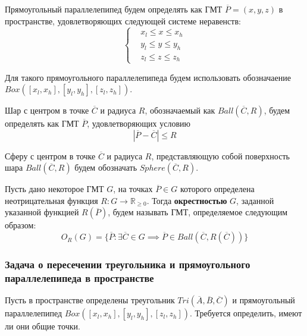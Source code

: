 Прямоугольный параллелепипед будем определять как ГМТ $\overline{P} = (x, y, z)$ в пространстве, удовлетворяющих следующей системе неравенств:
\begin{equation}\label{eqn:text_1_geo_prim_parallelepiped}
	\left\{
		\begin{aligned}
			& x_l \le x \le x_h \\
			& y_l \le y \le y_h \\
			& z_l \le z \le z_h
		\end{aligned}
	\right.
\end{equation}

Для такого прямоугольного параллелепипеда будем использовать обозначаение $Box([x_l, x_h], [y_l, y_h], [z_l, z_h])$.

Шар с центром в точке $\overline{C}$ и радиуса $R$, обозначаемый как $Ball(\overline{C}, R)$, будем определять как ГМТ $\overline{P}$, удовлетворяющих условию
\begin{equation}
	|\overline{P} - \overline{C}| \le R
\end{equation}

Сферу с центром в точке $\overline{C}$ и радиуса $R$, представляющую собой поверхность шара $Ball(\overline{C}, R)$ будем обозначать $Sphere(\overline{C}, R)$.

\begin{definition}
Пусть дано некоторое ГМТ $G$, на точках $\overline{P} \in G$ которого определена неотрицательная функция $R: G \rightarrow \mathbb{R}_{\ge 0}$.
Тогда \textbf{окрестностью}\label{term:envelope} $G$, заданной указанной функцией $R(\overline{P})$, будем называть ГМТ, определяемое следующим образом:
\begin{equation}
	O_R(G) = \{ \overline{P}: \exists \overline{C} \in G \implies \overline{P} \in Ball(\overline{C}, R(\overline{C})) \}
\end{equation}
\end{definition}

\subsubsection{Задача о пересечении треугольника и прямоугольного параллелепипеда в пространстве}\label{sec:text_1_geo_prim_tri_and_parallelepiped_int}

Пусть в пространстве определены треугольник $Tri(\overline{A}, \overline{B}, \overline{C})$ и прямоугольный параллелепипед $Box([x_l, x_h], [y_l, y_h], [z_l, z_h])$.
Требуется определить, имеют ли они общие точки.

